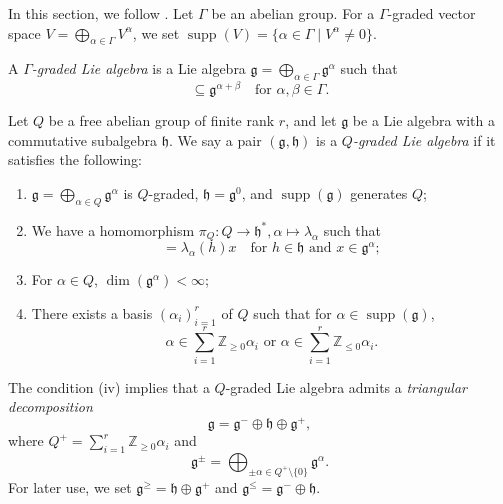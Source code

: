 \documentclass[a4paper, 12pt, reqno]{amsart}
\theoremstyle{remark}
\DeclareMathOperator{\supp}{supp}
\begin{document}
In this section, we follow \cite[\S2]{iohara_representation_2011}.
Let $\Gamma$ be an abelian group.
For a $\Gamma$-graded vector space $V = \bigoplus_{\alpha \in \Gamma}V^{\alpha}$, we set $\supp(V) = \{\alpha \in \Gamma \mid V^{\alpha} \neq 0\}$.

A \emph{$\Gamma$-graded Lie algebra} is a Lie algebra $\mathfrak{g} = \bigoplus_{\alpha \in \Gamma}\mathfrak{g}^{\alpha}$ such that
\begin{equation*}
  [\mathfrak{g}^{\alpha}, \mathfrak{g}^{\beta}] \subseteq \mathfrak{g}^{\alpha + \beta} \quad \text{for $\alpha, \beta \in \Gamma$}.
\end{equation*}

Let $Q$ be a free abelian group of finite rank $r$, and let $\mathfrak{g}$ be a Lie algebra with a commutative subalgebra $\mathfrak{h}$.
We say a pair $(\mathfrak{g}, \mathfrak{h})$ is a \emph{$Q$-graded Lie algebra} if it satisfies the following:
\begin{enumerate}
\item $\mathfrak{g} = \bigoplus_{\alpha \in Q}\mathfrak{g}^{\alpha}$ is $Q$-graded, $\mathfrak{h} = \mathfrak{g}^0$, and $\supp(\mathfrak{g})$ generates $Q$;
\item We have a homomorphism $\pi_Q: Q \to \mathfrak{h}^*, \alpha \mapsto \lambda_{\alpha}$ such that
  \begin{equation*}
    [h, x] = \lambda_{\alpha}(h)x \quad \text{for $h \in \mathfrak{h}$ and $x \in \mathfrak{g}^{\alpha}$};
  \end{equation*}
\item For $\alpha \in Q$, $\dim(\mathfrak{g}^{\alpha}) < \infty$;
\item There exists a basis $(\alpha_i)_{i = 1}^r$ of $Q$ such that for $\alpha \in \supp(\mathfrak{g})$,
  \begin{equation*}
    \text{$\alpha \in \sum_{i = 1}^r\mathbb{Z}_{\ge 0}\alpha_i$ or $\alpha \in \sum_{i = 1}^r\mathbb{Z}_{\le 0}\alpha_i$}.
  \end{equation*}
\end{enumerate}

The condition (iv) implies that a $Q$-graded Lie algebra admits a \emph{triangular decomposition}
\begin{equation*}
  \mathfrak{g} = \mathfrak{g}^- \oplus \mathfrak{h} \oplus \mathfrak{g}^+,
\end{equation*}
where $Q^+ = \sum_{i = 1}^r\mathbb{Z}_{\ge 0}\alpha_i$ and
\begin{equation*}
  \mathfrak{g}^{\pm} = \bigoplus_{\pm \alpha \in Q^+ \setminus \{0\}}\mathfrak{g}^{\alpha}.
\end{equation*}
For later use, we set $\mathfrak{g}^{\ge} = \mathfrak{h} \oplus \mathfrak{g}^+$ and $\mathfrak{g}^{\le} = \mathfrak{g}^- \oplus \mathfrak{h}$.
\end{document}
